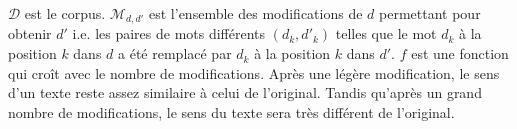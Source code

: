 $\mathcal{D}$ est le corpus. $\mathcal{M}_{d, d'}$ est l'ensemble des modifications de $d$ permettant pour obtenir $d'$ i.e. les paires de mots différents $(d_{k}, d'_{k})$ telles que le mot $d_{k}$ à la position $k$ dans $d$ a été remplacé par $d_{k}$ à la position $k$ dans $d'$. $f$ est une fonction qui croît avec le nombre de modifications. Après une légère modification, le sens d'un texte reste assez similaire à celui de l'original. Tandis qu'après un grand nombre de modifications, le sens du texte sera très différent de l'original. 

%

